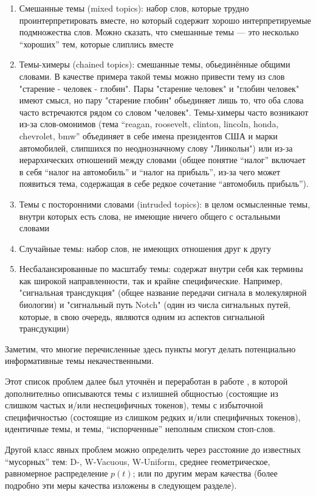 \begin{enumerate}
\item{Смешанные темы (mixed topics): набор слов, которые трудно проинтерпретировать вместе, но который содержит хорошо интерпретируемые подмножества слов. Можно сказать, что смешанные темы --- это несколько ``хороших'' тем, которые слиплись вместе}
\item{Темы-химеры (chained topics): смешанные темы, обьединённые общими словами. В качестве примера такой темы можно привести тему из слов "старение - человек - глобин". Пары "старение человек" и "глобин человек" имеют смысл, но пару "старение глобин" обьединяет лишь то, что оба слова часто встречаются рядом со словом "человек". Темы-химеры часто возникают из-за слов-омонимов (тема ``reagan, roosevelt, clinton, lincoln, honda, chevrolet, bmw'' объединяет в себе имена президентов США и марки автомобилей, слипшихся по неоднозначному слову "Линкольн") или из-за иерархических отношений между словами (общее понятие ``налог'' включает в себя ``налог на автомобиль'' и ``налог на прибыль'', из-за чего может появиться тема, содержащая в себе редкое сочетание ``автомобиль прибыль'').}
\item{Темы с посторонними словами (intruded topics): в целом осмысленные темы, внутри которых есть слова, не имеющие ничего общего с остальными словами}
\item{Случайные темы: набор слов, не имеющих отношения друг к другу}
\item{Несбалансированные по масштабу темы: содержат внутри себя как термины как широкой направленности, так и крайне специфические. Например, "сигнальная трансдукция" (общее название передачи сигнала в молекулярной биологии) и "сигнальный путь Notch" (один из числа сигнальных путей, которые, в свою очередь, являются одним из аспектов сигнальной трансдукции)}
\end{enumerate}

Заметим, что многие перечисленные здесь пункты могут делать потенциально информативные темы некачественными.

Этот список проблем далее был уточнён и переработан в работе \cite{boydcare}, в которой дополнителньо описываются темы с излишней общностью (состоящие из слишком частых и/или неспецифичных токенов), темы с избыточной специфичностью (состоящие из слишком редких и/или специфичных токенов), идентичные темы, и темы, ``испорченные'' неполным списком стоп-слов.

Другой класс явных проблем можно определить через расстояние до известных ``мусорных'' тем: D-, W-Vacuous, W-Uniform, среднее геометрическое, равномерное распределение $p(t)$; или по другим мерам качества (более подробно эти меры качества изложены в следующем разделе). 

